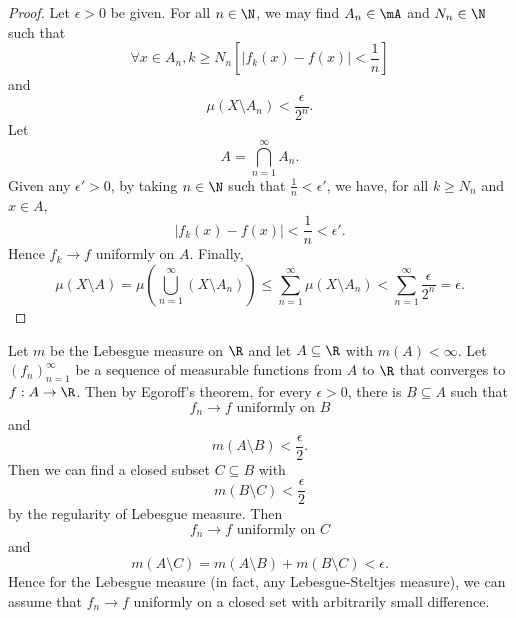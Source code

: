 \documentclass[pmath451]{subfiles}
\begin{document}
    \begin{proof}
        Let $\epsilon>0$ be given. For all $n\in\N$, we may find $A_n\in\mA$ and $N_n\in\N$ such that
        \begin{equation*}
            \forall x\in A_n, k\geq N_n\left[ \left| f_k\left( x \right)-f\left( x \right) \right|<\frac{1}{n} \right]
        \end{equation*}
        and
        \begin{equation*}
            \mu\left( X\setminus A_n \right) < \frac{\epsilon}{2^n}.
        \end{equation*}
        Let
        \begin{equation*}
            A = \bigcap^{\infty}_{n=1} A_n.
        \end{equation*}
        Given any $\epsilon'>0$, by taking $n\in\N$ such that $\frac{1}{n}<\epsilon'$, we have, for all $k\geq N_n$ and $x\in A$,
        \begin{equation*}
            \left| f_k\left( x \right)-f\left( x \right) \right|<\frac{1}{n}<\epsilon'.
        \end{equation*}
        Hence $f_k\to f$ uniformly on $A$. Finally,
        \begin{equation*}
            \mu\left( X\setminus A \right) = \mu\left( \bigcup^{\infty}_{n=1}\left( X\setminus A_n \right) \right) \leq \sum^{\infty}_{n=1}\mu\left( X\setminus A_n \right) < \sum^{\infty}_{n=1} \frac{\epsilon}{2^n} = \epsilon.
        \end{equation*}
    \end{proof}
    
    \np Let $m$ be the Lebesgue measure on $\R$ and let $A\subseteq\R$ with $m\left( A \right)<\infty$. Let $\left( f_{n} \right)^{\infty}_{n=1}$ be a sequence of measurable functions from $A$ to $\R$ that converges to $f:A\to\R$. Then by Egoroff's theorem, for every $\epsilon>0$, there is $B\subseteq A$ such that
    \begin{equation*}
        f_n\to f\text{ uniformly on }B
    \end{equation*}
    and
    \begin{equation*}
        m\left( A\setminus B \right) < \frac{\epsilon}{2}.
    \end{equation*}
    Then we can find a closed subset $C\subseteq B$ with
    \begin{equation*}
        m\left( B\setminus C \right) < \frac{\epsilon}{2}
    \end{equation*}
    by the regularity of Lebesgue measure. Then
    \begin{equation*}
        f_n\to f\text{ uniformly on }C
    \end{equation*}
    and
    \begin{equation*}
        m\left( A\setminus C \right) = m\left( A\setminus B \right) + m\left( B\setminus C \right) < \epsilon.
    \end{equation*}
    Hence for the Lebesgue measure (in fact, any Lebesgue-Steltjes measure), we can assume that $f_n\to f$ uniformly on a closed set with arbitrarily small difference.
    
\end{document}
